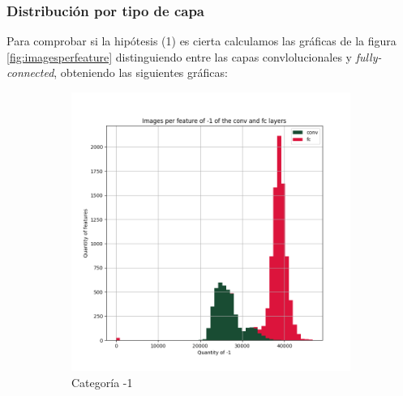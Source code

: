 \documentclass[12,twoside]{TFG-GM}
\theoremstyle{definition}
\theoremstyle{remark}
\begin{document}
\subsubsection{Distribución por tipo de capa}
Para comprobar si la hipótesis (1) es cierta calculamos las gráficas de la figura \ref{fig:imagesperfeature} distinguiendo entre las capas convlolucionales y \textit{fully-connected}, obteniendo las siguientes gráficas: 

\begin{figure}[ht] 
	\centering
	\begin{subfigure}[b]{0.3\textwidth}
		\includegraphics[width=\textwidth] {Images/plots/25/Images_per_feature_of_-1_category_all_layers.png}
		\caption{Categoría -1}
	\end{subfigure}
	\begin{subfigure}[b]{0.3\textwidth}

\end{subfigure}
\end{figure}
\end{document}
